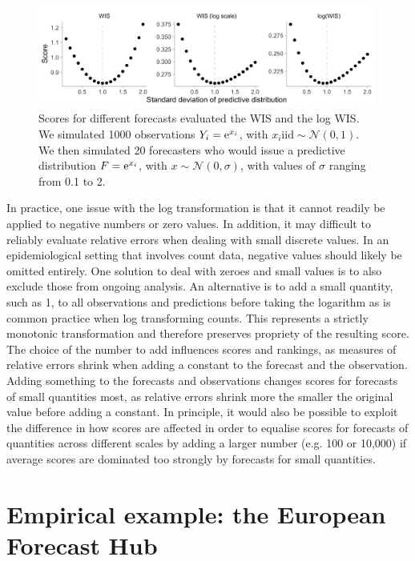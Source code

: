 \documentclass{article}
\begin{document}
\begin{figure}[h!]
    \centering
    \includegraphics[width=0.99\textwidth]{output/figures/example-log-first.png}
    \caption{Scores for different forecasts evaluated the WIS and the log WIS. We simulated 1000 observations $Y_i = {\rm e}^{x_i}$, with $x_i \text{iid} \sim \mathcal{N}(0, 1)$. We then simulated 20 forecasters who would issue a predictive distribution $F = {\rm e}^{x_i}$, with $x \sim \mathcal{N}(0, \sigma)$, with values of $\sigma$ ranging from 0.1 to 2.}
    \label{fig:log-improper}
\end{figure}

In practice, one issue with the log transformation is that it cannot readily be applied to negative numbers or zero values. In addition, it may difficult to reliably evaluate relative errors when dealing with small discrete values. In an epidemiological setting that involves count data, negative values should likely be omitted entirely. One solution to deal with zeroes and small values is to also exclude those from ongoing analysis. An alternative is to add a small quantity, such as 1, to all observations and predictions before taking the logarithm as is common practice when log transforming counts. This represents a strictly monotonic transformation and therefore preserves propriety of the resulting score. The choice of the number to add influences scores and rankings, as measures of relative errors shrink when adding a constant to the forecast and the observation. Adding something to the forecasts and observations changes scores for forecasts of small quantities most, as relative errors shrink more the smaller the original value before adding a constant. In principle, it would also be possible to exploit the difference in how scores are affected in order to equalise scores for forecasts of quantities across different scales by adding a larger number (e.g. 100 or 10,000) if average scores are dominated too strongly by forecasts for small quantities. 



\section{Empirical example: the European Forecast Hub}
\end{document}
